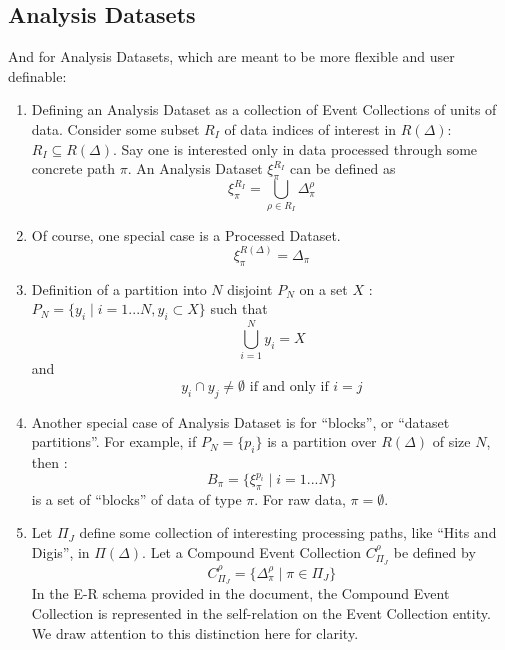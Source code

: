 \documentclass{cmspaper}
\begin{document}
\subsection{Analysis Datasets}

And for Analysis Datasets, which are meant to be more flexible and user definable: 

\begin{enumerate}

\item Defining an Analysis Dataset as a collection of Event Collections of 
      units of data. Consider some subset $R_I$ of data indices of interest 
      in $R(\Delta)$:  $R_I \subseteq R(\Delta)$. Say one is interested only 
      in data processed through some concrete path $\pi$.  An Analysis 
      Dataset $\xi_{\pi}^{R_I}$ can be defined as 
\begin{equation}
\xi_{\pi}^{R_I} = \bigcup_{\rho \in R_I} \Delta_{\pi}^{\rho}
\end{equation}

\item Of course, one special case is a Processed Dataset. 
\begin{equation} 
\xi_{\pi}^{R(\Delta)} = \Delta_{\pi}
\end{equation}


\item Definition of a partition into $N$ disjoint $P_N$ on a set $X$ : 
$ P_N = \{ y_i \mid i = 1...N, y_i \subset X \} $ such that 
\begin{equation}
\bigcup_{i=1}^N y_i = X
\end{equation} 
and 
\begin{equation} 
y_i \cap y_j \neq \emptyset \mbox{ if and only if } i = j
\end{equation}
 
\item  Another special case of Analysis Dataset is for ``blocks'', or 
       ``dataset partitions''.  For example, if
$P_N = \{ p_i \}$ is a partition over $R(\Delta)$ of size $N$, then : 
\begin{equation}
B_{\pi} = \{ \xi_{\pi}^{p_i} \mid i = 1...N\}
\end{equation}
is a set of ``blocks'' of data of type $\pi$.  For raw data, $\pi = \emptyset$.


\item Let $\Pi_J$ define some collection of interesting processing paths, 
      like ``Hits and Digis'', in $\Pi(\Delta)$.  Let a Compound Event 
      Collection $C_{\Pi_J}^{\rho}$ be defined by
\begin{equation}
C_{\Pi_J}^{\rho} = \{ \Delta_{\pi}^{\rho} \mid \pi \in \Pi_J \}
\end{equation}
In the E-R schema provided in the document, the Compound Event Collection
is represented in the self-relation on the Event Collection entity.
We draw attention to this distinction here for clarity.


\end{enumerate}
\end{document}
